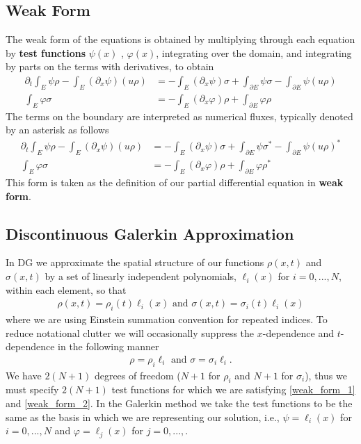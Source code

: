 \documentclass{report}
\numberwithin{equation}{section}
\begin{document}
\subsection{Weak Form}
The weak form of the equations is obtained by multiplying through each equation by \textbf{test functions} $\psi(x)$ , $\varphi(x)$, integrating over the domain, and integrating by parts on the terms with derivatives, to obtain
\begin{align}
    \partial_t \int_E \psi \rho - \int_E  (\partial_x \psi) (u \rho) &= 
    - \int_E (\partial_x \psi) \sigma 
    + \int_{\partial E} \psi \sigma - \int_{\partial E}  \psi (u \rho) 
    \\
    \int_E \varphi \sigma &= - \int_{E} (\partial_x \varphi) \rho + \int_{\partial E } \varphi \rho
\end{align}
The terms on the boundary are interpreted as numerical fluxes, typically denoted by an asterisk as follows
\begin{align}
    \label{weak_form_1}
    \partial_t \int_E \psi \rho - \int_E  (\partial_x \psi) (u \rho) &= 
    - \int_E (\partial_x \psi) \sigma 
    + \int_{\partial E} \psi \sigma ^* - \int_{\partial E}  \psi (u \rho)^* 
    \\
    \label{weak_form_2}
    \int_E \varphi \sigma &= - \int_{E} (\partial_x \varphi) \rho + \int_{\partial E } \varphi \rho^*
\end{align}
This form is taken as the definition of our partial differential equation in \textbf{weak form}.

\subsection{Discontinuous Galerkin Approximation}
In DG we approximate the spatial structure of our functions $\rho(x,t)$ and $\sigma(x,t)$ by a set of linearly independent polynomials, $\ell_i(x)$ for $i = 0, ..., N$, within each element, so that 
\begin{align}
    \rho(x,t) = \rho_i(t) \ell_i(x) \text{ and } \sigma(x,t) = \sigma_i(t) \ell_i(x)
\end{align}
where we are using Einstein summation convention for repeated indices. To reduce notational clutter we will occasionally suppress the $x$-dependence and $t$-dependence in the following manner 
\begin{align}
    \rho = \rho_i \ell_i \text{ and } \sigma = \sigma_i \ell_i.
\end{align}
We have $2(N+1)$ degrees of freedom ($N+1$ for $\rho_i$ and $N+1$ for $\sigma_i$), thus we must specify $2(N+1)$ test functions for which we are satisfying \ref{weak_form_1} and \ref{weak_form_2}. In the Galerkin method we take the test functions to be the same as the basis in which we are representing our solution, i.e., $\psi = \ell_i(x)$ for $i = 0,..., N$ and $\varphi = \ell_j(x)$ for $j = 0, ... , $.
\end{document}
